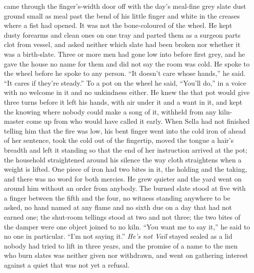  came through the finger's-width door off  with the day's meal-fine grey slate dust ground small as meal past the bend of his little finger and white in the creases where a fist had opened. It was not the bone-coloured  of the wheel. He kept dusty forearms and clean ones on one tray and parted them as a surgeon parts clot from vessel, and asked neither which slate had been broken nor whether it was a birth-slate. Three or more men had gone low into  before first grey, and he gave the house no name for them and did not say the room was cold. He spoke to the wheel before he spoke to any person. “It doesn't care whose hands,” he said. “It cares if they're steady.” To a pot on the wheel he said, “You'll do,” in a voice with no welcome in it and no unkindness either. He knew the  that pot would give three turns before it left his hands, with air under it and a want in it, and kept the knowing where nobody could make a song of it, withheld from any kiln-master come up from  who would have called it early. When Sella had not finished telling him that the fire was low, his bent finger went into the cold iron of  ahead of her sentence, took the cold out of the fingertip, moved the tongue a hair's breadth and left it standing so that the end of her instruction arrived at the pot; the household straightened around his silence the way cloth straightens when a weight is lifted. One piece of iron had two bites in it, the holding and the taking, and there was no  word for both mercies. He grew quieter and the yard went on around him without an order from anybody. The burned slate stood at five with a finger between the fifth and the four, no witness standing anywhere to be asked, no hand named at any flame and no sixth due on a day that had not earned one; the shut-room tellings stood at two and not three; the two bites of the damper were one object joined to no kiln. “You want me to say it,” he said to no one in particular. “I'm not saying it.” \emph{He's not Vail} stayed sealed as a lid nobody had tried to lift in three years, and the promise of a name to the men who burn slates was neither given nor withdrawn, and went on gathering interest against a quiet that was not yet a refusal.

